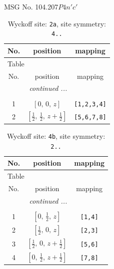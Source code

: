\documentclass[fleqn,8pt]{jsarticle}
\begin{document}
\setcounter{MaxMatrixCols}{32}

\renewcommand{\tablename}{Table~}
\renewcommand{\figurename}{Figure~}
\begin{center}
\LARGE
MSG No. 104.207\quad$P4n'c'$
\end{center}
\renewcommand{\arraystretch}{1.2}
\begin{longtable}{ccc}
\caption{Wyckoff site: {\tt 2a}, site symmetry: {\tt 4..}}
 \\
 \hline \hline
No. & position & mapping \\ \hline \endfirsthead

\multicolumn{2}{l}{\tablename\ \thetable{}} \\
 \hline \hline
No. & position & mapping \\ \hline \endhead

 \hline \hline
\multicolumn{2}{r}{\footnotesize\it continued ...} \\ \endfoot

 \hline \hline
\multicolumn{2}{r}{} \\ \endlastfoot

1 & $\left[ 0,\, 0,\, z \right]$ & {\tt [1,2,3,4]} \\ \hline
2 & $\left[ \frac{1}{2},\, \frac{1}{2},\, z + \frac{1}{2} \right]$ & {\tt [5,6,7,8]} \\
\end{longtable}
\renewcommand{\arraystretch}{1.2}
\begin{longtable}{ccc}
\caption{Wyckoff site: {\tt 4b}, site symmetry: {\tt 2..}}
 \\
 \hline \hline
No. & position & mapping \\ \hline \endfirsthead

\multicolumn{2}{l}{\tablename\ \thetable{}} \\
 \hline \hline
No. & position & mapping \\ \hline \endhead

 \hline \hline
\multicolumn{2}{r}{\footnotesize\it continued ...} \\ \endfoot

 \hline \hline
\multicolumn{2}{r}{} \\ \endlastfoot

1 & $\left[ 0,\, \frac{1}{2},\, z \right]$ & {\tt [1,4]} \\ \hline
2 & $\left[ \frac{1}{2},\, 0,\, z \right]$ & {\tt [2,3]} \\ \hline
3 & $\left[ \frac{1}{2},\, 0,\, z + \frac{1}{2} \right]$ & {\tt [5,6]} \\ \hline
4 & $\left[ 0,\, \frac{1}{2},\, z + \frac{1}{2} \right]$ & {\tt [7,8]} \\
\end{longtable}
\end{document}
